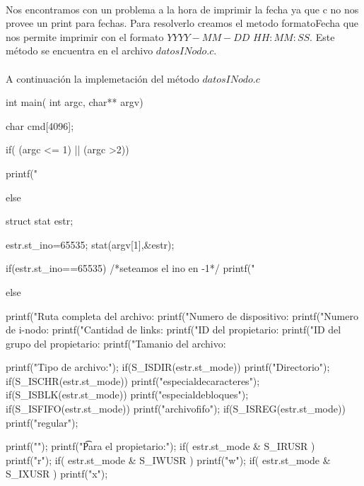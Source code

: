 \paragraph{} Nos encontramos con un problema a la hora de imprimir la fecha ya que c no 
nos provee un print para fechas. Para resolverlo creamos el metodo formatoFecha que nos 
permite imprimir con el formato $YYYY-MM-DD$ $HH:MM:SS$. Este m\'etodo se encuentra en el archivo $datosINodo.c$.
\paragraph{} A continuaci\'on la implemetaci\'on del m\'etodo $datosINodo.c$

\begin{scriptsize} 
\begin{verbatimtab} 

int main( int argc, char** argv)
{

	char cmd[4096]; 	
	
	
	if( (argc <= 1) || (argc >2))
	{
	     	printf("%
	
	}
	else
	{
		struct stat estr;

		estr.st_ino=65535;
		stat(argv[1],&estr);
		
		if(estr.st_ino==65535) /*seteamos el ino en -1*/	
		{
			printf("%
		}	
		
		else {
			printf("Ruta completa del archivo:%
			printf("Numero de dispositivo: %
			printf("Numero de i-nodo: %
			printf("Cantidad de links: %
			printf("ID del propietario: %
			printf("ID del grupo del propietario: %
			printf("Tamanio del archivo: %


			printf("Tipo de archivo:");	
			if(S_ISDIR(estr.st_mode)) {
				printf("Directorio");
			}
			if(S_ISCHR(estr.st_mode)){ 
				printf("especialdecaracteres");
			}
			if(S_ISBLK(estr.st_mode)){
				printf("especialdebloques");
			}	
			if(S_ISFIFO(estr.st_mode)){
				printf("archivofifo");
			}
			if(S_ISREG(estr.st_mode)){
				printf("regular");
			}

	
			printf("\nPermisos\n");
			printf("\t Para el propietario:");
			if( estr.st_mode & S_IRUSR ){
				printf("r");
			}
			if( estr.st_mode & S_IWUSR ){
				printf("w");
			}
			if( estr.st_mode & S_IXUSR ){
				printf("x");
			}

}}}
\end{verbatimtab}
\end{scriptsize}
